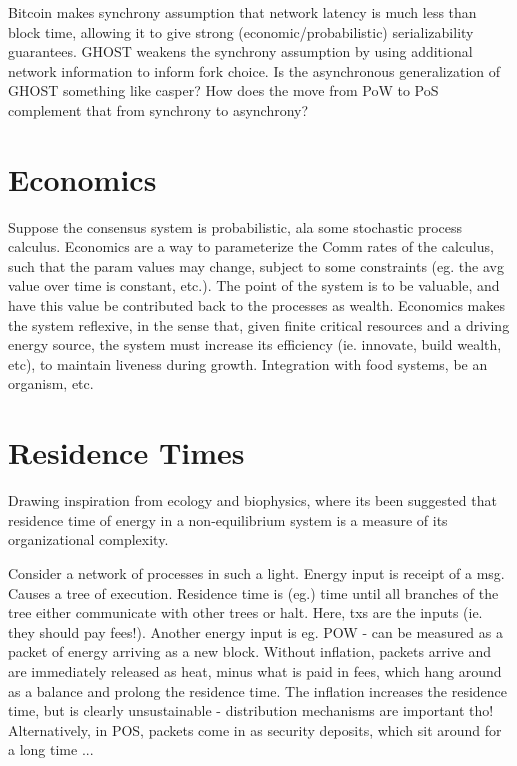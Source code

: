 Bitcoin makes synchrony assumption that network latency is much less than block time,
allowing it to give strong (economic/probabilistic) serializability guarantees.
GHOST weakens the synchrony assumption by using additional network information to inform fork choice.
Is the asynchronous generalization of GHOST something like casper?
How does the move from PoW to PoS complement that from synchrony to asynchrony?

\section{Economics}
Suppose the consensus system is probabilistic, ala some stochastic process calculus.
Economics are a way to parameterize the Comm rates of the calculus,
such that the param values may change, subject to some constraints 
(eg. the avg value over time is constant, etc.).
The point of the system is to be valuable,
and have this value be contributed back to the processes as wealth.
Economics makes the system reflexive, in the sense that,
given finite critical resources and a driving energy source,
the system must increase its efficiency (ie. innovate, build wealth, etc),
to maintain liveness during growth.
Integration with food systems, be an organism, etc.

\section{Residence Times}
Drawing inspiration from ecology and biophysics, 
where its been suggested that residence time of energy in a non-equilibrium system is a 
measure of its organizational complexity.

Consider a network of processes in such a light.
Energy input is receipt of a msg. 
Causes a tree of execution. 
Residence time is (eg.) time until all branches of the tree either communicate with other trees or halt.
Here, txs are the inputs (ie. they should pay fees!).
Another energy input is eg. POW - can be measured as a packet of energy arriving as a new block.
Without inflation, packets arrive and are immediately released as heat, minus what is paid in fees,
which hang around as a balance and prolong the residence time.
The inflation increases the residence time, but is clearly unsustainable - distribution mechanisms are important tho!
Alternatively, in POS, packets come in as security deposits, which sit around for a long time ...
